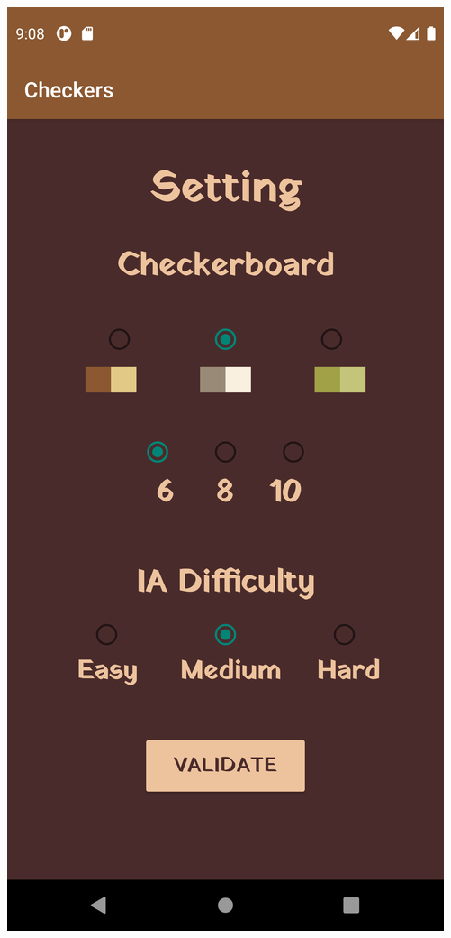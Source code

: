 \documentclass{article}
\begin{document}
\begin{center}
  \includegraphics[scale=0.1]{setting_en.png}

\end{center}
\end{document}
